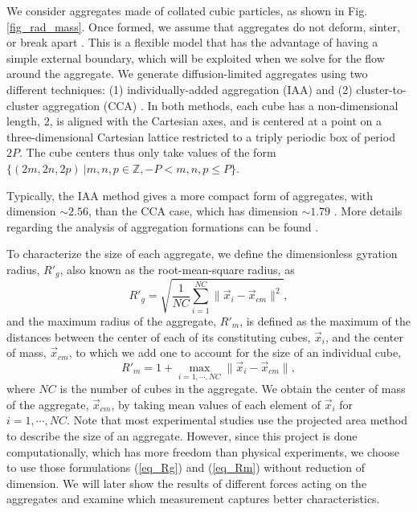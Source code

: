 We consider aggregates made of collated cubic particles, as shown in Fig. \ref{fig_rad_mass}. Once formed, we assume that aggregates do not deform, sinter, or break apart \cite{eggersdorfer_multiparticle_2011}.
This is a flexible model that has the advantage of having a
simple external boundary, which will be exploited when we solve for the flow around the aggregate. We generate diffusion-limited aggregates using two different techniques: (1)
individually-added aggregation (IAA) and (2) cluster-to-cluster aggregation (CCA) \cite{witten_tenuous_1986,kolb_anisotropic_1987}. In both methods, each cube has a non-dimensional length, $2$, is aligned with the Cartesian axes, and is centered at a point on a three-dimensional Cartesian lattice restricted to a triply periodic box of period $2P$. The cube centers thus only take values of the form $\{ (2m,2n,2p) \  | m,n,p \in \mathbb{Z}, -P<m,n,p\leq P \}$. 


Typically, the IAA method gives a more compact form of aggregates, with dimension $\sim 2.56$, than the CCA case, which has dimension $\sim 1.79$ \cite{witten_diffusion-limited_1981, kaye_random_2008}. More details regarding the analysis of aggregation formations can be found \cite{yoo_hydrodynamic_2020}.


\par 
To characterize the size of each aggregate, we define the dimensionless gyration radius, $R'_g$, also known as the root-mean-square radius, as
\begin{equation}
{R'}_g  = \sqrt{\frac{1}{NC} \sum_{i=1}^{NC} \| \vec{x}_i - \vec{x}_{cm} \|^2},
\label{eq_Rg}
\end{equation}
and the maximum radius of the aggregate, $R'_m$, is defined as the
maximum of the distances between the center of each of its constituting cubes, $\vec{x}_i$, and the center of
mass, $\vec{x}_{cm}$, to which we add one to account for the size of an individual cube,
\begin{equation}
{R'}_m = 1+ \max_{i = 1, \cdots, NC} \| \vec{x}_i - \vec{x}_{cm} \|,
\label{eq_Rm}
\end{equation}
where $NC$ is the number of cubes in the aggregate.
We obtain the center of mass of the aggregate, $\vec{x}_{cm}$, by taking mean values of each element of $\vec{x}_i$ for $i = 1, \cdots, NC$.
Note that most experimental studies use the projected area method to describe the size of an aggregate. However, since this project is done computationally, which has more freedom than physical experiments, we choose to use those formulations (\ref{eq_Rg}) and (\ref{eq_Rm}) without reduction of dimension.
We will later show the results of different forces acting on the aggregates and examine which measurement captures better characteristics.

